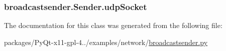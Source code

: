 \subsubsection[{udp\+Socket}]{\setlength{\rightskip}{0pt plus 5cm}broadcastsender.\+Sender.\+udp\+Socket}\label{classbroadcastsender_1_1Sender_a63ab35ba16188f340762ad6f8f4f17af}


The documentation for this class was generated from the following file\+:\begin{DoxyCompactItemize}
\item 
packages/\+Py\+Qt-\/x11-\/gpl-\/4../examples/network/\hyperlink{broadcastsender_8py}{broadcastsender.\+py}\end{DoxyCompactItemize}
